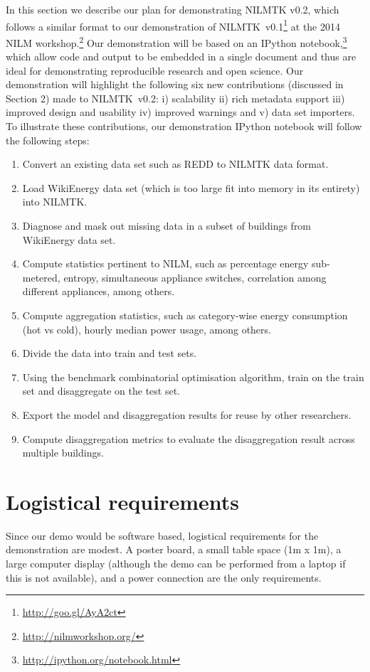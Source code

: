 \documentclass[10pt,abstract]{sensys-proc}
\begin{document}
In this section we describe our plan for demonstrating NILMTK v0.2, which follows a similar format to our demonstration of NILMTK~v0.1\footnote{\url{http://goo.gl/AyA2ct}} at the 2014 NILM workshop.\footnote{\url{http://nilmworkshop.org/}} Our demonstration will be based on an IPython notebook,\footnote{\url{http://ipython.org/notebook.html}} which allow code and output to be embedded in a single document and thus are ideal for demonstrating reproducible research and open science. Our demonstration will highlight the following six new contributions (discussed in Section 2) made to NILMTK~v0.2: i) scalability ii) rich metadata support iii) improved design and usability iv) improved warnings and v) data set importers. To illustrate these contributions, our demonstration IPython notebook will follow the following steps:
\begin{enumerate}
\item Convert an existing data set such as REDD to NILMTK data format.
\item Load WikiEnergy data set (which is too large fit into memory in its entirety) into NILMTK.
\item Diagnose and mask out missing data in a subset of buildings from WikiEnergy data set.
\item Compute statistics pertinent to NILM, such as percentage energy sub-metered, entropy, simultaneous appliance switches, correlation among different appliances, among others.
\item Compute aggregation statistics, such as category-wise energy consumption (hot vs cold), hourly median power usage, among others.
\item Divide the data into train and test sets.
\item Using the benchmark combinatorial optimisation algorithm, train on the train set and disaggregate on the test set.
\item Export the model and disaggregation results for reuse by other researchers.
\item Compute disaggregation metrics to evaluate the disaggregation result across multiple buildings.
\end{enumerate}

\section{Logistical requirements}
Since our demo would be software based, logistical requirements for the demonstration are modest. A poster board, a small table space (1m x 1m), a large computer display (although the demo can be performed from a laptop if this is not available), and a power connection are the only requirements.
\fi
\end{document}
